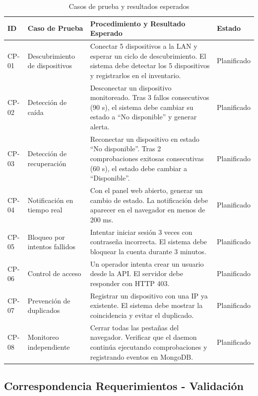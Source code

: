 \documentclass[12pt,a4paper]{report}
\begin{document}
\begin{table}[htbp]
\centering
\caption{Casos de prueba y resultados esperados}\label{tab:pruebas}
\small
\begin{tabularx}{\textwidth}{p{0.8cm} p{3.5cm} X p{2.0cm}}
\toprule
\textbf{ID} & \textbf{Caso de Prueba} & \textbf{Procedimiento y Resultado Esperado} & \textbf{Estado} \\
\midrule
CP-01 & Descubrimiento de dispositivos & Conectar 5 dispositivos a la LAN y esperar un ciclo de descubrimiento. El sistema debe detectar los 5 dispositivos y registrarlos en el inventario. & Planificado \\
\midrule
CP-02 & Detección de caída & Desconectar un dispositivo monitoreado. Tras 3 fallos consecutivos (90 s), el sistema debe cambiar su estado a ``No disponible'' y generar alerta. & Planificado \\
\midrule
CP-03 & Detección de recuperación & Reconectar un dispositivo en estado ``No disponible''. Tras 2 comprobaciones exitosas consecutivas (60 s), el estado debe cambiar a ``Disponible''. & Planificado \\
\midrule
CP-04 & Notificación en tiempo real & Con el panel web abierto, generar un cambio de estado. La notificación debe aparecer en el navegador en menos de 200 ms. & Planificado \\
\midrule
CP-05 & Bloqueo por intentos fallidos & Intentar iniciar sesión 3 veces con contraseña incorrecta. El sistema debe bloquear la cuenta durante 3 minutos. & Planificado \\
\midrule
CP-06 & Control de acceso & Un operador intenta crear un usuario desde la API. El servidor debe responder con HTTP 403. & Planificado \\
\midrule
CP-07 & Prevención de duplicados & Registrar un dispositivo con una IP ya existente. El sistema debe mostrar la coincidencia y evitar el duplicado. & Planificado \\
\midrule
CP-08 & Monitoreo independiente & Cerrar todas las pestañas del navegador. Verificar que el daemon continúa ejecutando comprobaciones y registrando eventos en MongoDB. & Planificado \\
\bottomrule
\end{tabularx}
\end{table}

\subsection{Correspondencia Requerimientos - Validación}
\end{document}
